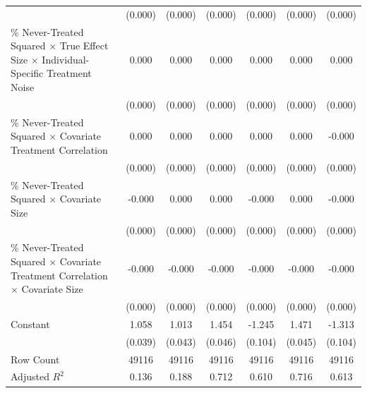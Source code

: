 \documentclass[12pt]{article}
\begin{document}
\begin{table}[htbp]
{\begin{tabular}{p{4.5in}|*{6}{c}}
                    &     (0.000)         &     (0.000)         &     (0.000)         &     (0.000)         &     (0.000)         &     (0.000)         \\
\% Never-Treated Squared $\times$ True Effect Size $\times$ Individual-Specific Treatment Noise&       0.000\sym{*}  &       0.000\sym{*}  &       0.000         &       0.000         &       0.000         &       0.000         \\
                    &     (0.000)         &     (0.000)         &     (0.000)         &     (0.000)         &     (0.000)         &     (0.000)         \\
\% Never-Treated Squared $\times$ Covariate Treatment Correlation&       0.000\sym{**} &       0.000         &       0.000         &       0.000         &       0.000         &      -0.000         \\
                    &     (0.000)         &     (0.000)         &     (0.000)         &     (0.000)         &     (0.000)         &     (0.000)         \\
\% Never-Treated Squared $\times$ Covariate Size&      -0.000         &       0.000         &       0.000         &      -0.000\sym{**} &       0.000         &      -0.000\sym{*}  \\
                    &     (0.000)         &     (0.000)         &     (0.000)         &     (0.000)         &     (0.000)         &     (0.000)         \\
\% Never-Treated Squared $\times$ Covariate Treatment Correlation $\times$ Covariate Size&      -0.000\sym{*}  &      -0.000\sym{*}  &      -0.000         &      -0.000         &      -0.000         &      -0.000         \\
                    &     (0.000)         &     (0.000)         &     (0.000)         &     (0.000)         &     (0.000)         &     (0.000)         \\
Constant            &       1.058\sym{***}&       1.013\sym{***}&       1.454\sym{***}&      -1.245\sym{***}&       1.471\sym{***}&      -1.313\sym{***}\\
                    &     (0.039)         &     (0.043)         &     (0.046)         &     (0.104)         &     (0.045)         &     (0.104)         \\
\hline
Row Count           &   49116         &   49116         &   49116         &   49116         &   49116         &   49116         \\
Adjusted $R^2$  &       0.136         &       0.188         &       0.712         &       0.610         &       0.716         &       0.613         \\

\end{tabular}}
\end{table}
\end{document}
